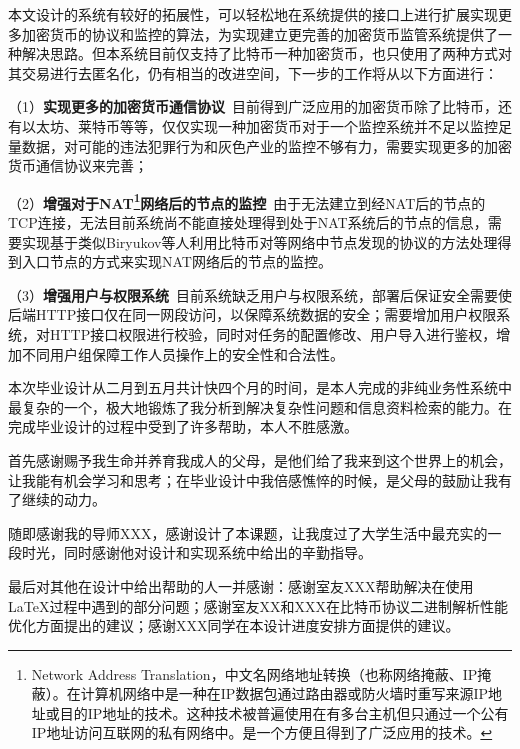 \documentclass[supercite]{HustGraduPaper}
\theoremstyle{definition}
\begin{document}
本文设计的系统有较好的拓展性，可以轻松地在系统提供的接口上进行扩展实现更多加密货币的协议和监控的算法，为实现建立更完善的加密货币监管系统提供了一种解决思路。但本系统目前仅支持了比特币一种加密货币，也只使用了两种方式对其交易进行去匿名化，仍有相当的改进空间，下一步的工作将从以下方面进行：

（1）\textbf{实现更多的加密货币通信协议}\ 目前得到广泛应用的加密货币除了比特币，还有以太坊、莱特币等等，仅仅实现一种加密货币对于一个监控系统并不足以监控足量数据，对可能的违法犯罪行为和灰色产业的监控不够有力，需要实现更多的加密货币通信协议来完善；

（2）\textbf{增强对于NAT\footnote{Network Address Translation，中文名网络地址转换（也称网络掩蔽、IP掩蔽）。在计算机网络中是一种在IP数据包通过路由器或防火墙时重写来源IP地址或目的IP地址的技术。这种技术被普遍使用在有多台主机但只通过一个公有IP地址访问互联网的私有网络中。是一个方便且得到了广泛应用的技术。}网络后的节点的监控}\ 由于无法建立到经NAT后的节点的TCP连接，无法目前系统尚不能直接处理得到处于NAT系统后的节点的信息，需要实现基于类似Biryukov\cite{biryukov2014deanonymisation}等人利用比特币对等网络中节点发现的协议的方法处理得到入口节点的方式来实现NAT网络后的节点的监控。

（3）\textbf{增强用户与权限系统}\ 目前系统缺乏用户与权限系统，部署后保证安全需要使后端HTTP接口仅在同一网段访问，以保障系统数据的安全；需要增加用户权限系统，对HTTP接口权限进行校验，同时对任务的配置修改、用户导入进行鉴权，增加不同用户组保障工作人员操作上的安全性和合法性。


\begin{thankpage}

本次毕业设计从二月到五月共计快四个月的时间，是本人完成的非纯业务性系统中最复杂的一个，极大地锻炼了我分析到解决复杂性问题和信息资料检索的能力。在完成毕业设计的过程中受到了许多帮助，本人不胜感激。

首先感谢赐予我生命并养育我成人的父母，是他们给了我来到这个世界上的机会，让我能有机会学习和思考；在毕业设计中我倍感憔悴的时候，是父母的鼓励让我有了继续的动力。

随即感谢我的导师XXX，感谢设计了本课题，让我度过了大学生活中最充实的一段时光，同时感谢他对设计和实现系统中给出的辛勤指导。

最后对其他在设计中给出帮助的人一并感谢：感谢室友XXX帮助解决在使用\LaTeX 过程中遇到的部分问题；感谢室友XX和XXX在比特币协议二进制解析性能优化方面提出的建议；感谢XXX同学在本设计进度安排方面提供的建议。

\end{thankpage}

\nocite{*}

\end{document}
